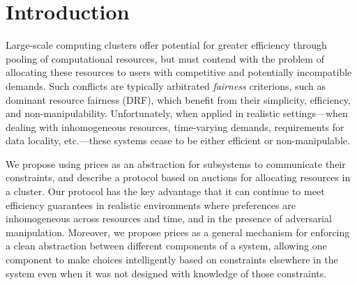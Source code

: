 \documentclass{acm_proc_article-sp}
\begin{document}
\maketitle
\begin{abstract}

\end{abstract}




\section{Introduction}
\label{sec:intro}

Large-scale computing clusters offer potential for greater efficiency through
pooling of computational resources, but must contend with the problem of
allocating these resources to users with competitive and potentially
incompatible demands. Such conflicts are typically arbitrated \emph{fairness}
criterions, such as dominant resource fairness (DRF), which benefit from their
simplicity, efficiency, and non-manipulability. Unfortunately, when applied in
realistic settings---when dealing with inhomogeneous resources, time-varying
demands, requirements for data locality, etc.---these systems cease to be either
efficient or non-manipulable.

We propose using prices as an abstraction for subsystems to communicate their
constraints, and describe a protocol based on auctions for allocating resources
in a cluster. Our protocol has the key advantage that it can continue to meet
efficiency guarantees in realistic environments where preferences are
inhomogeneous across resources and time, and in the presence of adversarial
manipulation. Moreover, we propose prices as a general mechanism for enforcing a
clean abstraction between different components of a system, allowing one
component to make choices intelligently based on constraints elsewhere in the
system even when it was not designed with knowledge of those constraints.
\end{document}
